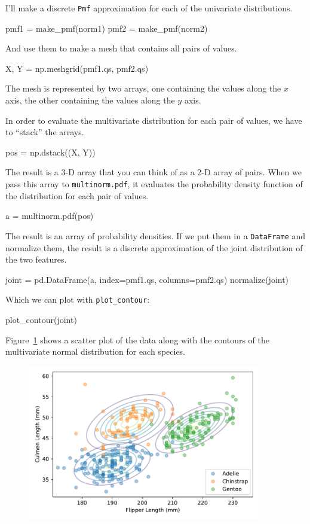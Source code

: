 \documentclass[12pt]{book}
\theoremstyle{exercise}
\newcommand{\py}[1]{{\tt #1}}%
\begin{document}
I'll make a discrete \py{Pmf} approximation for
each of the univariate distributions.

\begin{code}
pmf1 = make_pmf(norm1)
pmf2 = make_pmf(norm2)
\end{code}

And use them to make a mesh that contains all pairs of values.

\begin{code}
X, Y = np.meshgrid(pmf1.qs, pmf2.qs)
\end{code}

The mesh is represented by two arrays, one containing the values along
the $x$ axis, the other containing the values along the $y$ axis.

In order to evaluate the multivariate distribution for each pair of
values, we have to ``stack'' the arrays.

\begin{code}
pos = np.dstack((X, Y))
\end{code}

The result is a 3-D array that you can think of as a 2-D array of pairs.
When we pass this array to \py{multinorm.pdf}, it
evaluates the probability density function of the distribution for each
pair of values.

\begin{code}
a = multinorm.pdf(pos)
\end{code}

The result is an array of probability densities. If we put them in a
\py{DataFrame} and normalize them, the result is a
discrete approximation of the joint distribution of the two features.

\begin{code}
joint = pd.DataFrame(a, index=pmf1.qs, columns=pmf2.qs)
normalize(joint)
\end{code}

Which we can plot with \py{plot_contour}:

\begin{code}
plot_contour(joint)
\end{code}

Figure~\ref{fig10-04} shows a scatter plot of the data along with the
contours of the multivariate normal distribution for each species.

\begin{figure}
\centerline{\includegraphics[width=4in]{figs/fig10-04.pdf}}
\caption{}
\label{fig10-04}
\end{figure}
\end{document}
